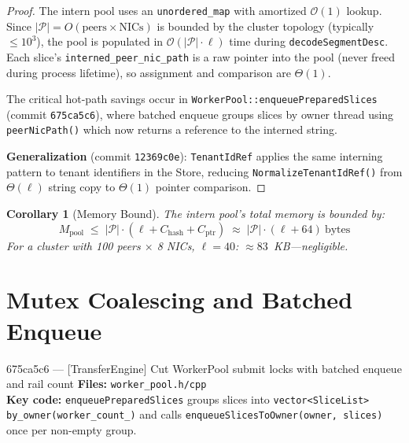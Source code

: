 \documentclass[11pt,a4paper,twoside]{article}
\theoremstyle{plain}
\newtheorem{corollary}[theorem]{Corollary}
\theoremstyle{definition}
\theoremstyle{remark}
\newcommand{\BigO}{\mathcal{O}}
\begin{document}
\begin{proof}
The intern pool uses an \texttt{unordered\_map} with amortized $\BigO(1)$ lookup.
Since $|\mathcal{P}| = O(\text{peers} \times \text{NICs})$ is bounded by the cluster
topology (typically $\leq 10^3$), the pool is populated in
$\BigO(|\mathcal{P}| \cdot \ell)$ time during \texttt{decodeSegmentDesc}.
Each slice's \texttt{interned\_peer\_nic\_path} is a raw pointer into the pool
(never freed during process lifetime), so assignment and comparison are $\Theta(1)$.

The critical hot-path savings occur in \texttt{WorkerPool::enqueuePreparedSlices}
(commit \texttt{675ca5c6}), where batched enqueue groups slices by owner thread
using \texttt{peerNicPath()} which now returns a reference to the interned string.

\textbf{Generalization} (commit \texttt{12369c0e}): \texttt{TenantIdRef} applies
the same interning pattern to tenant identifiers in the Store, reducing
\texttt{NormalizeTenantIdRef()} from $\Theta(\ell)$ string copy to $\Theta(1)$
pointer comparison.
\end{proof}

\begin{corollary}[Memory Bound]
The intern pool's total memory is bounded by:
\begin{equation}
  M_{\text{pool}} \;\leq\; |\mathcal{P}| \cdot (\ell + C_{\text{hash}} + C_{\text{ptr}})
  \;\approx\; |\mathcal{P}| \cdot (\ell + 64)\ \text{bytes}
\end{equation}
For a cluster with 100 peers $\times$ 8 NICs, $\ell = 40$: $\approx 83$~KB---negligible.
\end{corollary}


\section{Mutex Coalescing and Batched Enqueue}
\label{sec:mutex-coalesce}

\begin{commitbox}{675ca5c6 --- [TransferEngine] Cut WorkerPool submit locks with batched
enqueue and rail count}
\textbf{Files:} \texttt{worker\_pool.h/cpp}\\
\textbf{Key code:} \texttt{enqueuePreparedSlices} groups slices into
\texttt{vector<SliceList> by\_owner(worker\_count\_)} and calls
\texttt{enqueueSlicesToOwner(owner, slices)} once per non-empty group.
\end{commitbox}
\end{document}
